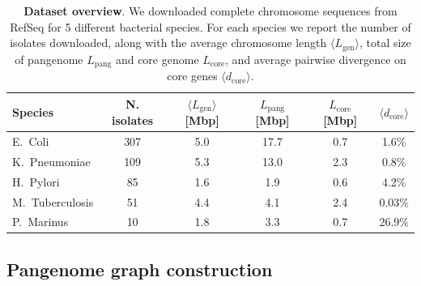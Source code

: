 \documentclass[aps,rmp,reprint,superscriptaddress,notitlepage,10pt,onecolumn]{revtex4-1}
\newcommand{\avg}[1]{\langle #1 \rangle}
\newcommand{\Lcore}{L_\text{core}}
\newcommand{\Lpang}{L_\text{pang}}
\newcommand{\Lgen}{L_\text{gen}}
\newcommand{\dcore}{\langle d_\text{core} \rangle}
\begin{document}
\begin{table}[hb]
    \setlength{\tabcolsep}{9pt}
    \begin{tabular}{lccccc}
        \hline\hline
        Species         & N. isolates & $\avg{\Lgen}$ [Mbp] & $\Lpang$ [Mbp] & $\Lcore$ [Mbp] & $\dcore$ \\
        \hline
        E.~Coli         & 307         & 5.0                 & 17.7           & 0.7            & 1.6\%    \\
        K.~Pneumoniae   & 109         & 5.3                 & 13.0           & 2.3            & 0.8\%    \\
        H.~Pylori       & 85          & 1.6                 & 1.9            & 0.6            & 4.2\%    \\
        M.~Tuberculosis & 51          & 4.4                 & 4.1            & 2.4            & 0.03\%   \\
        P.~Marinus      & 10          & 1.8                 & 3.3            & 0.7            & 26.9\%   \\
        \hline
    \end{tabular}
    \caption{{\bf Dataset overview}. We downloaded complete chromosome sequences from RefSeq for 5 different bacterial species. For each species we report the number of isolates downloaded, along with the average chromosome length $\avg{\Lgen}$, total size of pangenome  $\Lpang$ and core genome $\Lcore$, and average pairwise divergence on core genes $\dcore$.}
    \label{table:panx-dataset}
\end{table}


\subsection{Pangenome graph construction}
\end{document}
